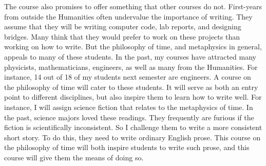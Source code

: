 \documentclass[oneside, 10pt]{article}
\begin{document}
The course also promises to offer something that other courses do not. First-years from outside the Humanities  often undervalue the importance of writing. They assume that they will be writing computer code, lab reports, and designing bridges. Many think that they would prefer to work on these projects than working on how to write. But the philosophy of time, and metaphysics in general, appeals to many of these students. In the past, my courses have attracted many physicists, mathematicians, engineers, as well as many from the Humanities. For instance, 14 out of 18 of my students next semester are engineers.   A course on the philosophy of time will cater to these students. It will serve as both an entry point to different disciplines, but also inspire them to learn how to write well. For instance, I will assign science fiction that relates to the metaphysics of time. In the past, science majors loved these readings. They frequently are furious if the fiction is scientifically inconsistent. So I challenge them to write a more consistent short story. To do this, they need to write ordinary English prose. This course on the philosophy of time will both inspire students to write such prose, and this course will give them the means of doing so. 
\end{document}
